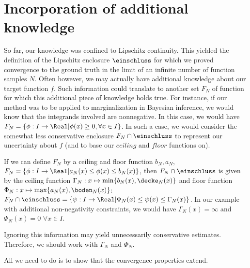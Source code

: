 \section{Incorporation of additional knowledge}
So far, our knowledge was confined to Lipschitz continuity. This yielded the definition of the Lipschitz enclosure $\einschluss$ for which we proved convergence to the ground truth in the limit of an infinite number of function samples $N$. Often however, we may actually have additional knowledge about our target function $f$. Such information could translate to another set $F_N$ of function for which this additional piece of knowledge holds true. For instance, if our method was to be applied to marginalization in Bayesian inference, we would know that the integrands involved are nonnegative. In this case, we would have $F_N =\{ \phi: I \to \Real | \phi(x) \geq 0, \forall x \in I\}$. 
In such a case, we would consider the somewhat less conservative enclosure 
$F_N \cap \einschluss$ to represent our uncertainty about $f$ (and to base our $ceiling$ and $floor$ functions on).

If we can define $F_N$ by a ceiling and floor function $b_N,a_N$, $F_N = \{\phi : I \to \Real | a_N(x) \leq \phi(x) \leq b_N(x) \}$, then $F_N \cap \einschluss$ is given by the ceiling function $\Gamma_N: x \mapsto \min\{b_N(x), \decke_N(x) \}$ and floor function $\Phi_N:  x \mapsto \max\{a_N(x), \boden_N(x) \}$:
$F_N \cap \einschluss = \{ \psi : I \to \Real | \Phi_N(x) \leq \psi(x) \leq \Gamma_N(x) \}$.
In our example with additional non-negativity constraints, we would have $\Gamma_N (x) = \infty$ and $\Phi_N(x) = 0$ $\forall x \in I$.

Ignoring this information may yield unnecessarily conservative estimates. 
Therefore, we should work with $\Gamma_N$ and $\Phi_N$.

All we need to do is to show that the convergence properties extend.

